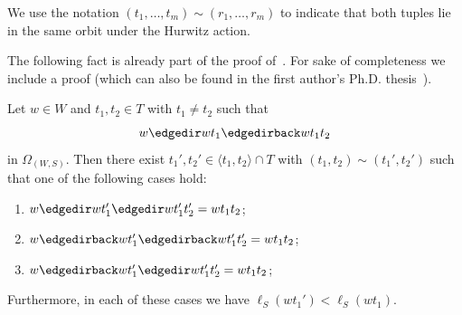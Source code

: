 We use the notation $(t_1, \ldots, t_m) \sim (r_1, \ldots , r_m)$ to indicate that both tuples lie in the same orbit under the Hurwitz action.

\medskip
The following fact is already part of the proof of~\cite[Proposition~2.2]{BDSW14}. For sake of completeness we include a proof (which can also be found in the first author's Ph.D. thesis~\cite[Proposition~2.3.6]{Weg17}).

\begin{prop} \label{prop:BruhatGraphDihedral}
Let $w \in W$ and $t_1,t_2 \in T$ with $t_1 \neq t_2$ such that 
\[ 
w \edgedir wt_1 \edgedirback wt_1t_2
\]
in $\Omega_{(W,S)}$. Then there exist $t_1', t_2 ' \in \langle t_1, t_2 \rangle \cap T$ with $(t_1, t_2) \sim (t_1', t_2')$ such that one of the following cases hold:
\begin{enumerate}
\item\label{prop2.2_1} $ w \edgedir wt_1' \edgedir wt_1't_2'= wt_1t_2$;
\item\label{prop2.2_2} $ w \edgedirback wt_1' \edgedirback wt_1't_2'= wt_1t_2$;
\item\label{prop2.2_3} $ w \edgedirback wt_1' \edgedir wt_1't_2'= wt_1t_2$;
\end{enumerate}
Furthermore, in each of these cases we have $\ell_S(wt_1')<\ell_S(wt_1)$.
\end{prop}


